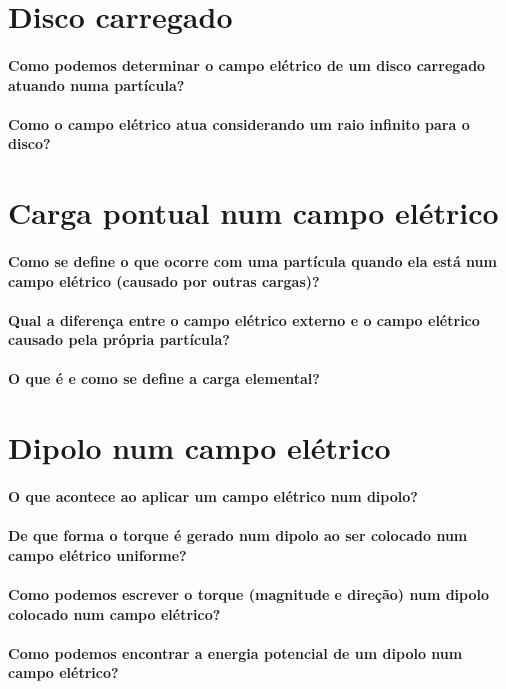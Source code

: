\section*{Disco carregado}

  \paragraph{Como podemos determinar o campo elétrico de um disco carregado atuando numa partícula?}

  \paragraph{Como o campo elétrico atua considerando um raio infinito para o disco?}

\section*{Carga pontual num campo elétrico}

  \paragraph{Como se define o que ocorre com uma partícula quando ela está num campo elétrico (causado por outras cargas)?}

  \paragraph{Qual a diferença entre o campo elétrico externo e o campo elétrico causado pela própria partícula?}

  \paragraph{O que é e como se define a carga elemental?}

\section*{Dipolo num campo elétrico}

  \paragraph{O que acontece ao aplicar um campo elétrico num dipolo?}

  \paragraph{De que forma o torque é gerado num dipolo ao ser colocado num campo elétrico uniforme?}

  \paragraph{Como podemos escrever o torque (magnitude e direção) num dipolo colocado num campo elétrico?}

  \paragraph{Como podemos encontrar a energia potencial de um dipolo num campo elétrico?}

  


